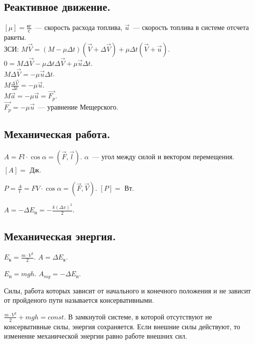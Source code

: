 \documentclass{article}
\begin{document}
	\subsection{Реактивное движение.}
	$[\mu] = \frac{\text{кг}}{\text{с}}$~--- скорость расхода топлива, $\vec{u}$~--- скорость топлива в системе отсчета ракеты. \\
	ЗСИ: $M \vec{V} = (M - \mu \varDelta t)(\vec{V} + \varDelta \vec{V}) + \mu \varDelta t (\vec{V} + \vec{u})$. \\
	$0 = M \varDelta \vec{V} - \mu \varDelta t \varDelta \vec{V} + \mu \vec{u} \varDelta t$. \\
	$M \varDelta \vec{V} = -\mu \vec{u} \varDelta t$. \\
	$M \frac{\varDelta \vec{V}}{\varDelta t} = -\mu \vec{u}$. \\
	$M \vec{a} = - \mu \vec{u} = \vec{F_{p}}$. \\
	$\vec{F_{p}} = -\mu \vec{u}$~--- уравнение Мещерского.
	\subsection{Механическая работа.}
	\begin{definition}
		$A = Fl \cdot \cos \alpha = (\vec{F}, \vec{l})$. $\alpha$~--- угол между силой и вектором перемещения. $[A] =$ Дж.
	\end{definition}
	\begin{definition}[Мощность]
		$P = \frac{A}{t} = FV \cdot \cos \alpha = (\vec{F}, \vec{V})$. $[P] =$ Вт.
	\end{definition}
	\begin{definition}
		$A = -\varDelta E_{\text{п}} = -\frac{k (\varDelta x)^2}{2}$.
	\end{definition}
	\subsection{Механическая энергия.}
	\begin{definition}
		$E_{\text{к}} = \frac{m \cdot V^2}{2}$. $A = \varDelta E_{\text{к}}$.
	\end{definition}
	\begin{definition}
		$E_{\text{п}} = mgh$. $A_{mg} = - \varDelta E_{\text{п}}$.
	\end{definition}
	\begin{definition}
		Силы, работа которых зависит от начального и конечного положения и не зависит от пройденого пути называется консервативными.
	\end{definition}
	\begin{definition}
		$\frac{m \cdot V^2}{2} + mgh = const$. В замкнутой системе, в которой отсутствуют не консервативные силы, энергия сохраняется. Если внешние силы действуют, то изменение механической энергии равно работе внешних сил.
	\end{definition}
\end{document}
